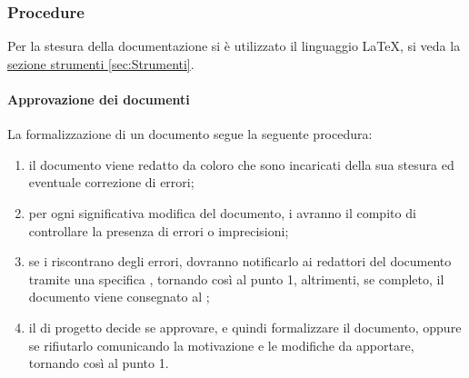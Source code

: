 \subsubsection{Procedure}
Per la stesura della documentazione si è utilizzato il linguaggio \LaTeX{}, si veda la \hyperref[sec:Strumenti]{sezione strumenti \ref*{sec:Strumenti}}.
\paragraph{Approvazione dei documenti}
La formalizzazione di un documento segue la seguente procedura:
\begin{enumerate}
	\item il documento viene redatto da coloro che sono incaricati della sua stesura ed eventuale correzione di errori;
	\item per ogni significativa modifica del documento, i \VERP{} avranno il compito di controllare la presenza di errori o imprecisioni;
	\item se i \VERP{} riscontrano degli errori, dovranno notificarlo ai redattori del documento tramite una specifica , tornando così al punto 1, altrimenti, se completo, il documento viene consegnato al \RESP{};
	\item il \RESP{} di progetto decide se approvare, e quindi formalizzare il documento, oppure se rifiutarlo comunicando la motivazione e le modifiche da apportare, tornando così al punto 1.
\end{enumerate}
